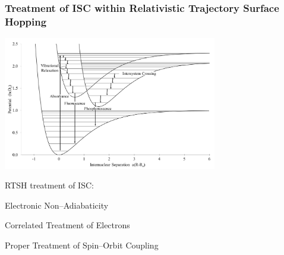 \documentclass[usepdftitle=false,10pt]{beamer}
\newcommand{\cmark}{\color{green} \ding{51}}%
\newcommand{\done}{\rlap{$\square$}{\raisebox{2pt}{\large\hspace{1pt}\cmark}}%
\hspace{-2.5pt}}
\begin{document}
\begin{frame}
  \frametitle{Treatment of ISC within Relativistic Trajectory Surface Hopping}
  \begin{center}
  \includegraphics[width=0.7\textwidth]{ISC} 
  \end{center}
  \vspace{-0.5cm}
  RTSH treatment of ISC: 
  \begin{mylist}
    \item[\done] Electronic Non--Adiabaticity
    \item[\done] Correlated Treatment of Electrons
    \item[\done] Proper Treatment of Spin--Orbit Coupling
  \end{mylist}
\end{frame}
\end{document}
